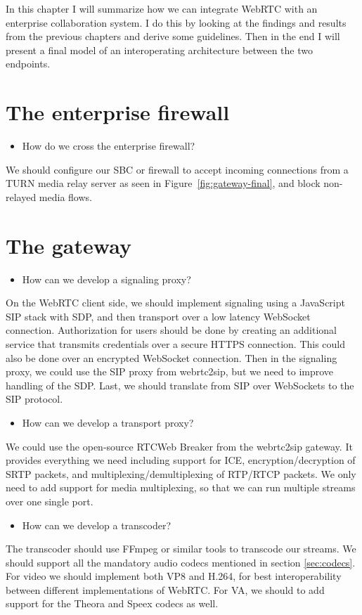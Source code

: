 In this chapter I will summarize how we can integrate WebRTC with an enterprise collaboration system. I do this by looking at the findings and results from the previous chapters and derive some guidelines. Then in the end I will present a final model of an interoperating architecture between the two endpoints.

\section{The enterprise firewall}

\begin{itemize}
\item How do we cross the enterprise firewall?
\end{itemize}
We should configure our SBC or firewall to accept incoming connections from a TURN media relay server as seen in Figure~\ref{fig:gateway-final}, and block non-relayed media flows.

\section{The gateway}

\begin{itemize}
\item How can we develop a signaling proxy?
\end{itemize}
On the WebRTC client side, we should implement signaling using a JavaScript SIP stack with SDP, and then transport over a low latency WebSocket connection. Authorization for users should be done by creating an additional service that transmits credentials over a secure HTTPS connection. This could also be done over an encrypted WebSocket connection. Then in the signaling proxy, we could use the SIP proxy from webrtc2sip, but we need to improve handling of the SDP. Last, we should translate from SIP over WebSockets to the SIP protocol.

\begin{itemize}
\item How can we develop a transport proxy?
\end{itemize}
We could use the open-source RTCWeb Breaker from the webrtc2sip gateway. It provides everything we need including support for ICE, encryption/decryption of SRTP packets, and multiplexing/demultiplexing of RTP/RTCP packets. We only need to add support for media multiplexing, so that we can run multiple streams over one single port.

\begin{itemize}
\item How can we develop a transcoder?
\end{itemize}
The transcoder should use FFmpeg or similar tools to transcode our streams. We should support all the mandatory audio codecs mentioned in section \ref{sec:codecs}. For video we should implement both VP8 and H.264, for best interoperability between different implementations of WebRTC. For VA, we should to add support for the Theora and Speex codecs as well.

